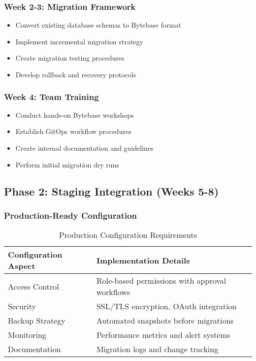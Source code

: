 \subsubsection{Week 2-3: Migration Framework}
\begin{itemize}
    \item Convert existing database schemas to Bytebase format
    \item Implement incremental migration strategy
    \item Create migration testing procedures
    \item Develop rollback and recovery protocols
\end{itemize}

\subsubsection{Week 4: Team Training}
\begin{itemize}
    \item Conduct hands-on Bytebase workshops
    \item Establish GitOps workflow procedures
    \item Create internal documentation and guidelines
    \item Perform initial migration dry runs
\end{itemize}

\subsection{Phase 2: Staging Integration (Weeks 5-8)}

\subsubsection{Production-Ready Configuration}
\begin{table}[H]
\centering
\begin{tabular}{|l|l|}
\hline
\textbf{Configuration Aspect} & \textbf{Implementation Details} \\
\hline
Access Control & Role-based permissions with approval workflows \\
\hline
Security & SSL/TLS encryption, OAuth integration \\
\hline
Backup Strategy & Automated snapshots before migrations \\
\hline
Monitoring & Performance metrics and alert systems \\
\hline
Documentation & Migration logs and change tracking \\
\hline
\end{tabular}
\caption{Production Configuration Requirements}
\label{tab:production-config}
\end{table}

